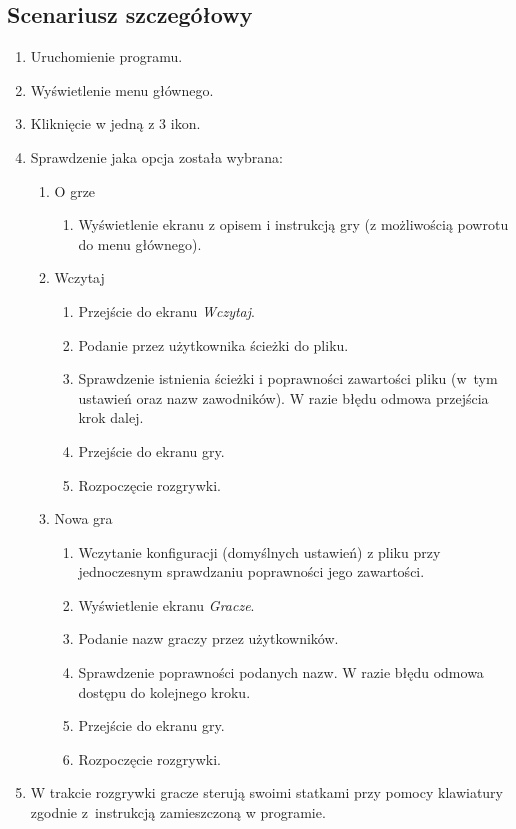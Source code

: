 \documentclass[a4paper]{article}
\begin{document}
\subsection{Scenariusz szczegółowy}\label{ss}
\begin{enumerate}
	\item Uruchomienie programu.
	\item Wyświetlenie menu głównego.
	\item Kliknięcie w jedną z 3 ikon.
	\item Sprawdzenie jaka opcja została wybrana:
	\begin{enumerate}
		\item O grze
		\begin{enumerate}
			\item Wyświetlenie ekranu z opisem i instrukcją gry (z możliwością powrotu do menu głównego).
		\end{enumerate}
		\item Wczytaj
        \begin{enumerate}
            \item Przejście do ekranu \textit{Wczytaj}.
			\item Podanie przez użytkownika ścieżki do pliku.
			\item Sprawdzenie istnienia ścieżki i poprawności zawartości pliku (w~tym ustawień oraz nazw zawodników). W razie błędu odmowa przejścia krok dalej.
			\item Przejście do ekranu gry.
			\item Rozpoczęcie rozgrywki.
        \end{enumerate}
		\item Nowa gra
		\begin{enumerate}
			\item Wczytanie konfiguracji (domyślnych ustawień) z pliku przy jednoczesnym sprawdzaniu poprawności jego zawartości.
			\item Wyświetlenie ekranu \textit{Gracze}.
			\item Podanie nazw graczy przez użytkowników.
			\item Sprawdzenie poprawności podanych nazw. W razie błędu odmowa dostępu do kolejnego kroku.
			\item Przejście do ekranu gry.
			\item Rozpoczęcie rozgrywki.
        \end{enumerate}
    \end{enumerate}
    \item W trakcie rozgrywki gracze sterują swoimi statkami przy pomocy klawiatury zgodnie z~instrukcją zamieszczoną w programie.

\end{enumerate}
\end{document}
